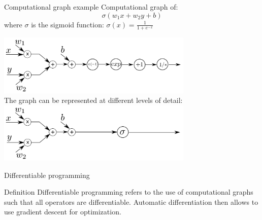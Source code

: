 \documentclass[xcolor=pdftex,dvipsnames,table,mathserif]{beamer}
\begin{document}
\begin{frame}{Computational graph example}
  Computational graph of:
  \[
  \sigma(w_1x + w_2y + b)
  \]
  where $\sigma$ is the sigmoid function: $\sigma(x) = \frac{1}{1 + e^{-x}}$

\vspace{3em}
\pause

  \centering
  \includegraphics[width=0.7\textwidth]{comp_graph2}\\
  \pause
  The graph can be represented at different levels of detail:
  \includegraphics[width=0.7\textwidth]{comp_graph}

\end{frame}

\begin{frame}{Differentiable programming}

  \begin{block}{Definition}
    Differentiable programming refers to the use of computational graphs such that all operators are differentiable. Automatic differentiation then allows to use gradient descent for optimization.
  \end{block}

\end{frame}


\end{document}
